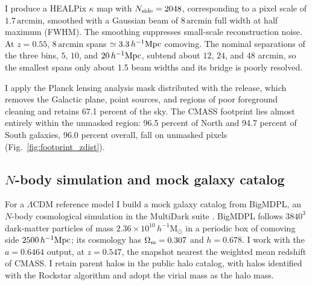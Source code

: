 \documentclass[11pt,letterpaper]{article}
\newcommand{\hinvMpc}{h^{-1}{\rm Mpc}}
\begin{document}
I produce a HEALPix \citep{Gorski2005} $\kappa$ map with $N_{\rm side}=2048$, corresponding to a pixel scale of $1.7\,\mathrm{arcmin}$, smoothed with a Gaussian beam of $8\,\mathrm{arcmin}$ full width at half maximum (FWHM).
The smoothing suppresses small-scale reconstruction
noise. At $z=0.55$, $8\,\mathrm{arcmin}$ spans
$\simeq3.3\,\hinvMpc$ comoving. The nominal separations of the three bins,
$5$, $10$, and $20\,\hinvMpc$, subtend about $12$, $24$, and $48$ arcmin, so
the smallest spans only about 1.5 beam widths and its bridge is poorly
resolved.

I apply the Planck lensing analysis mask distributed with the release,
which removes the Galactic plane, point sources, and regions of poor
foreground cleaning and retains 67.1 percent of the sky. %
The CMASS footprint lies almost entirely within the unmasked region: 96.5 percent of North and 94.7 percent of South galaxies, 96.0 percent overall, fall on unmasked
pixels (Fig.~\ref{fig:footprint_zdist}). 

\subsection{$N$-body simulation and mock galaxy catalog}
\label{sec:sim}

For a $\Lambda$CDM reference model I build a mock galaxy catalog from
BigMDPL, an $N$-body cosmological simulation in the MultiDark suite
\citep{Klypin2016, Riebe2013}. BigMDPL follows $3840^{3}$ dark-matter
particles of mass $2.36\times10^{10}\,h^{-1}\mathrm{M}_{\odot}$ in a periodic
box of comoving side $2500\,\hinvMpc$; its cosmology has
$\Omega_{\rm m}=0.307$ and $h=0.678$. I work with the $a=0.6464$ output, at
$z=0.547$, the snapshot nearest the weighted mean redshift of CMASS. I retain parent halos in the public halo catalog, with halos identified with the Rockstar algorithm \citep{behroozi2012rockstar} and adopt the virial mass as the halo mass. 
\end{document}

